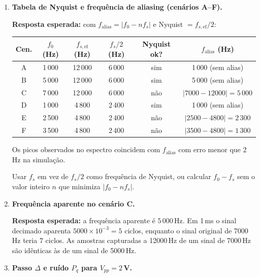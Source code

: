 \documentclass[11pt,a4paper]{article}
\begin{document}
\begin{enumerate}[label=\textbf{Q\arabic*.}, leftmargin=*, itemsep=1em]

  \item \textbf{Tabela de Nyquist e frequência de aliasing (cenários A--F).}

    \textbf{Resposta esperada:} com $f_\text{alias} = |f_0 - n f_s|$ e Nyquist
    $= f_{s,\text{ef}}/2$:

    \begin{center}
    \begin{tabular}{c c c c c c}
      \toprule
      Cen. & $f_0$ (Hz) & $f_{s,\text{ef}}$ (Hz) & $f_s/2$ (Hz) & Nyquist ok? & $f_\text{alias}$ (Hz) \\
      \midrule
      A & 1\,000 & 12\,000 & 6\,000 & sim & 1\,000 (sem alias) \\
      B & 5\,000 & 12\,000 & 6\,000 & sim & 5\,000 (sem alias) \\
      C & 7\,000 & 12\,000 & 6\,000 & não & $|7000-12000| = 5\,000$ \\
      D & 1\,000 & 4\,800  & 2\,400 & sim & 1\,000 (sem alias) \\
      E & 2\,500 & 4\,800  & 2\,400 & não & $|2500-4800| = 2\,300$ \\
      F & 3\,500 & 4\,800  & 2\,400 & não & $|3500-4800| = 1\,300$ \\
      \bottomrule
    \end{tabular}
    \end{center}
    Os picos observados no espectro coincidem com $f_\text{alias}$ com erro
    menor que 2\,Hz na simulação.

    \begin{nota}
      Usar $f_s$ em vez de $f_s/2$ como frequência de Nyquist, ou calcular
      $f_0 - f_s$ sem o valor inteiro $n$ que minimiza $|f_0 - n f_s|$.
    \end{nota}

  \item \textbf{Frequência aparente no cenário C.}

    \textbf{Resposta esperada:} a frequência aparente é $5\,000$\,Hz. Em
    1\,ms o sinal decimado aparenta $5000 \times 10^{-3} = 5$ ciclos,
    enquanto o sinal original de 7000\,Hz teria $7$ ciclos. As amostras
    capturadas a 12000\,Hz de um sinal de 7000\,Hz são idênticas às de um
    sinal de 5000\,Hz.

  \item \textbf{Passo $\Delta$ e ruído $P_q$ para $V_{pp}=2$\,V.}


\end{enumerate}
\end{document}
